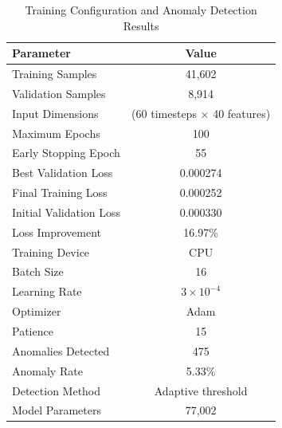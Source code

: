 \begin{table}[h]
\centering
\caption{Training Configuration and Anomaly Detection Results}
\label{table:training_results}
\begin{tabular}{|l|c|}
\hline
\textbf{Parameter} & \textbf{Value} \\ \hline
Training Samples & 41,602 \\ \hline
Validation Samples & 8,914 \\ \hline
Input Dimensions & (60 timesteps $\times$ 40 features) \\ \hline
Maximum Epochs & 100 \\ \hline
Early Stopping Epoch & 55 \\ \hline
Best Validation Loss & 0.000274 \\ \hline
Final Training Loss & 0.000252 \\ \hline
Initial Validation Loss & 0.000330 \\ \hline
Loss Improvement & 16.97\% \\ \hline
Training Device & CPU \\ \hline
Batch Size & 16 \\ \hline
Learning Rate & $3 \times 10^{-4}$ \\ \hline
Optimizer & Adam \\ \hline
Patience & 15 \\ \hline
Anomalies Detected & 475 \\ \hline
Anomaly Rate & 5.33\% \\ \hline
Detection Method & Adaptive threshold \\ \hline
Model Parameters & 77,002 \\ \hline
\end{tabular}
\end{table}